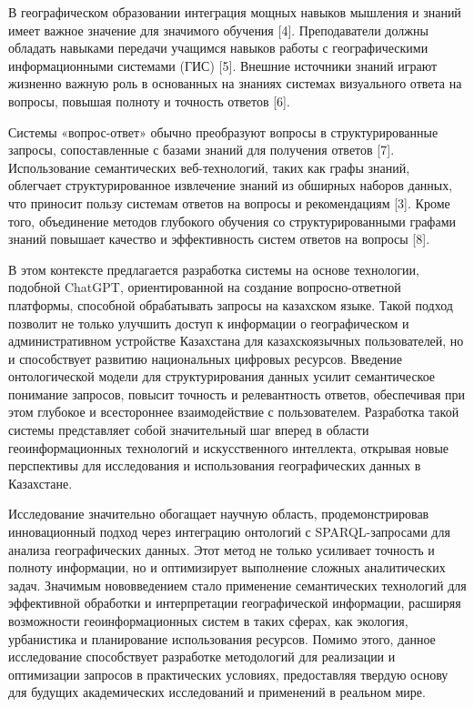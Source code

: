 В географическом образовании интеграция мощных навыков мышления и знаний
имеет важное значение для значимого обучения {[}4{]}. Преподаватели
должны обладать навыками передачи учащимся навыков работы с
географическими информационными системами (ГИС) {[}5{]}. Внешние
источники знаний играют жизненно важную роль в основанных на знаниях
системах визуального ответа на вопросы, повышая полноту и точность
ответов {[}6{]}.

Системы «вопрос-ответ» обычно преобразуют вопросы в структурированные
запросы, сопоставленные с базами знаний для получения ответов {[}7{]}.
Использование семантических веб-технологий, таких как графы знаний,
облегчает структурированное извлечение знаний из обширных наборов
данных, что приносит пользу системам ответов на вопросы и рекомендациям
{[}3{]}. Кроме того, объединение методов глубокого обучения со
структурированными графами знаний повышает качество и эффективность
систем ответов на вопросы {[}8{]}.

В этом контексте предлагается разработка системы на основе технологии,
подобной ChatGPT, ориентированной на создание вопросно-ответной
платформы, способной обрабатывать запросы на казахском языке. Такой
подход позволит не только улучшить доступ к информации о географическом
и административном устройстве Казахстана для казахскоязычных
пользователей, но и способствует развитию национальных цифровых
ресурсов. Введение онтологической модели для структурирования данных
усилит семантическое понимание запросов, повысит точность и
релевантность ответов, обеспечивая при этом глубокое и всестороннее
взаимодействие с пользователем. Разработка такой системы представляет
собой значительный шаг вперед в области геоинформационных технологий и
искусственного интеллекта, открывая новые перспективы для исследования и
использования географических данных в Казахстане.

Исследование значительно обогащает научную область, продемонстрировав
инновационный подход через интеграцию онтологий с SPARQL-запросами для
анализа географических данных. Этот метод не только усиливает точность и
полноту информации, но и оптимизирует выполнение сложных аналитических
задач. Значимым нововведением стало применение семантических технологий
для эффективной обработки и интерпретации географической информации,
расширяя возможности геоинформационных систем в таких сферах, как
экология, урбанистика и планирование использования ресурсов. Помимо
этого, данное исследование способствует разработке методологий для
реализации и оптимизации запросов в практических условиях, предоставляя
твердую основу для будущих академических исследований и применений в
реальном мире.

